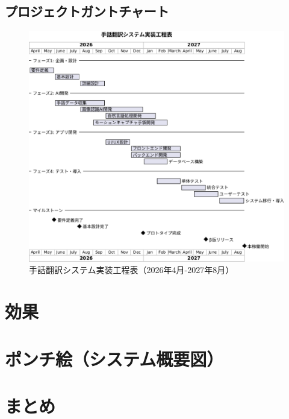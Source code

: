 \documentclass[12pt,a4paper]{jsarticle}
\begin{document}
\subsection{プロジェクトガントチャート}
\begin{figure}[H]
\centering
\includegraphics[width=\textwidth]{gantchart.eps}
\caption{手話翻訳システム実装工程表（2026年4月-2027年8月）}
\label{fig:gantchart}
\end{figure}

\section{効果}


\section{ポンチ絵（システム概要図）}


\section{まとめ}
\end{document}
